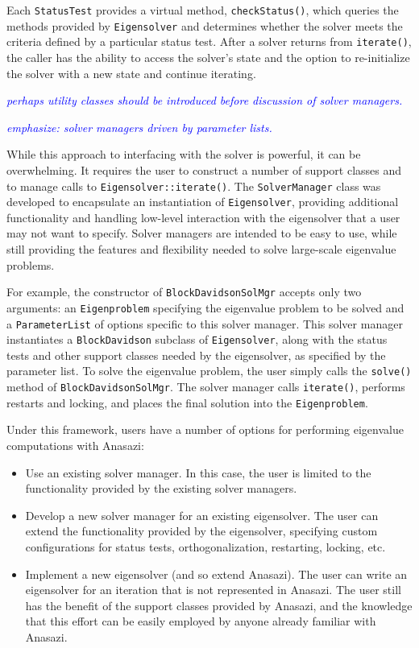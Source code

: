 \documentclass[acmtoms]{acmtrans2m}
\newcommand{\aspace}[1]{\texttt{#1}}
\newcommand{\cbcomm}[1]{\textcolor{blue}{\emph{#1}}}
\begin{document}
Each \aspace{StatusTest} provides a virtual method,
\verb!checkStatus()!, which queries the methods provided by
\aspace{Eigensolver} and determines whether the solver meets the
criteria defined by a particular status test. After a solver returns
from \verb!iterate()!, the caller has the ability to access the
solver's state and the option to re-initialize the solver with a new
state and continue iterating.

\cbcomm{perhaps utility classes should be introduced before discussion
of solver managers.}

\cbcomm{emphasize: solver managers driven by parameter lists.}

While this approach to interfacing with the solver is powerful, it can be overwhelming. It
requires the user to construct a number of support classes and to manage calls to
\verb!Eigensolver::iterate()!. The \aspace{SolverManager} class was developed to
encapsulate an instantiation of \aspace{Eigensolver}, providing additional functionality
and handling low-level interaction with the eigensolver that a user may not want to
specify. Solver managers are intended to be easy to use, while still providing the
features and flexibility needed to solve large-scale eigenvalue problems.

For example, the constructor of \aspace{BlockDavidsonSolMgr} accepts only two arguments:
an \aspace{Eigenproblem} specifying the eigenvalue problem to be solved and a
\texttt{ParameterList} of options specific to this solver manager. This solver manager
instantiates a \aspace{BlockDavidson} subclass of \aspace{Eigensolver}, along with the
status tests and other support classes needed by the eigensolver, as
specified by the parameter list. To solve the eigenvalue
problem, the user simply calls the \verb!solve()! method of \aspace{BlockDavidsonSolMgr}.
The solver manager calls \verb!iterate()!, performs restarts and locking, and places the
final solution into the \aspace{Eigenproblem}.

Under this framework, users have a number of options for performing eigenvalue
computations with Anasazi:
\begin{itemize}
\item
Use an existing solver manager. In this case, the user is limited to
the functionality provided by the existing solver managers.
\item
Develop a new solver manager for an existing eigensolver.
The user can extend the functionality provided by the eigensolver,
specifying custom configurations for status tests,
orthogonalization, restarting, locking,  etc.
\item
Implement a new eigensolver (and so extend Anasazi). The user can
write an eigensolver for an iteration that is not represented in
Anasazi. The user still has the benefit of the support classes
provided by Anasazi, and the knowledge that this effort can be
easily employed by anyone already familiar with Anasazi.
\end{itemize}
\end{document}
